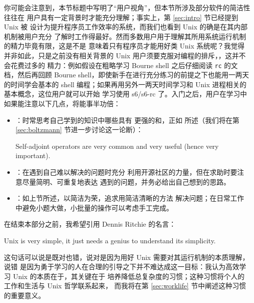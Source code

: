 你可能会注意到，本节标题中写明了“用户视角”，但本节所涉及部分软件的简洁性往往在
用户具有一定背景时才能充分理解；事实上，第 \ref{sec:intro} 节已经提到 Unix 被
设计为提升程序员工作效率的系统，而我们也看到 Unix 的确是在其内部机制被用户充分
了解时工作得最好。然而多数用户用于理解其所用系统运行机制的精力毕竟有限，这是不是
意味着只有程序员才能用好类 Unix 系统呢？我觉得并非如此，只是之前没有相关背景的
Unix 用户须要克服对编程的排斥，，这并不会花费过多的
精力：例如假设在粗略学习 Bourne shell 之后仔细阅读 \verb|rc| 的文档，然后再回顾
Bourne shell，即使新手在进行充分练习的前提之下也能用一两天的时间学会基本的 shell
编程；如果再用另外一两天时间学习和 Unix 进程相关的基本概念，这位用户就可以开始
学习使用 s6/s6-rc 了。入门之后，用户在学习中如果能注意以下几点，将能事半功倍：
\begin{itemize}
\item {}：时常思考自己学到的知识中哪些具有
	更强的和，正如 \parencite{dodson1991}
	所述（我们将在第 \ref{sec:boltzmann} 节进一步讨论这一论断）：
\begin{quoting}
	Self-adjoint operators are very common
	and very useful (hence very important).
\end{quoting}
\item {}：在遇到自己难以解决的问题时充分
	利用开源社区的力量，但在求助时要注意尽量简明、可重复地表达
	遇到的问题，并务必给出自己想到的思路。
\item {}：如上节所述，以简洁为荣，追求用简洁清晰的方法
	解决问题；在日常工作中避免小题大做，小批量的操作可以考虑手工完成。
\end{itemize}

在结束本部分之前，我希望引用 Dennis Ritchie 的名言：
\begin{quoting}
	Unix is very simple, it just needs a genius to understand its simplicity.
\end{quoting}
这句话可以说是既对也错，说对是因为用好 Unix 需要对其运行机制的本质理解，说错
是因为勇于学习的人在合理的引导之下并不难达成这一目标：我认为高效学习 Unix
的本质在于，其关键在于
培养降低总复杂度的习惯；这种习惯将个人的工作和生活与 Unix 哲学联系起来，
而我将在第 \ref{sec:worklife} 节中阐述这种习惯的重要意义。


